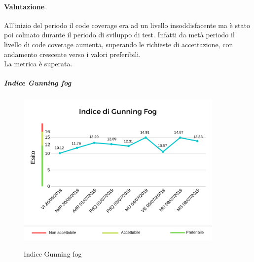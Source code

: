 	\paragraph*{Valutazione} All'inizio del periodo il code coverage era ad un livello insoddisfacente ma è stato poi colmato durante il periodo di sviluppo di test. Infatti da metà periodo il livello di code coverage aumenta, superando le richieste di accettazione, con andamento crescente verso i valori preferibili. \\
	La metrica è superata.
	\pagebreak
	\subparagraph{Indice Gunning fog}
	\begin{center}
		\begin{figure}[h] 
			\centering 
			\includegraphics[width=0.90\textwidth]{res/images/new/gunningfog.png}\\
			\caption{Indice Gunning fog}
		\end{figure}
	\end{center}
